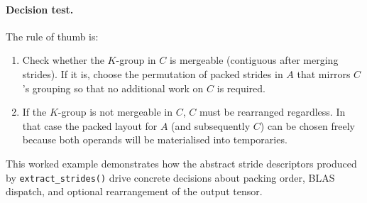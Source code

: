 \documentclass[11pt]{article}
\begin{document}
\paragraph{Decision test.}  The rule of thumb is:
\begin{enumerate}
  \item Check whether the $K$-group in $C$ is mergeable (contiguous after merging strides).  If it
        is, choose the permutation of packed strides in $A$ that mirrors $C$'s grouping so that no
        additional work on $C$ is required.
  \item If the $K$-group is not mergeable in $C$, $C$ must be rearranged regardless.  In that case the
        packed layout for $A$ (and subsequently $C$) can be chosen freely because both operands will
        be materialised into temporaries.
\end{enumerate}
This worked example demonstrates how the abstract stride descriptors produced by
\texttt{extract\_strides()} drive concrete decisions about packing order, BLAS dispatch, and optional
rearrangement of the output tensor.
\end{document}
